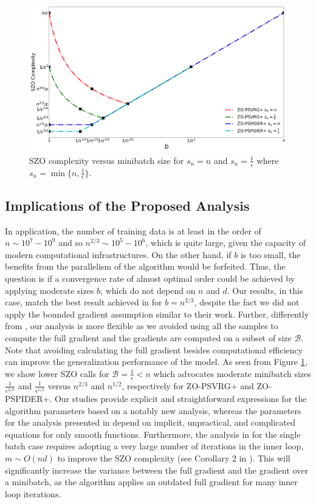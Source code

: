 \documentclass[iicol,sn-basic]{sn-jnl}
\theoremstyle{thmstyleone}%
\theoremstyle{thmstyletwo}%
\theoremstyle{thmstylethree}%
\begin{document}
\begin{figure}[hbt!]
\centering
\includegraphics[width=1.0\columnwidth]{SZO_Complexity.png}%
\caption{SZO complexity versus minibatch size for $s_n = n$ and $s_n = \frac{1}{\epsilon}$ where $s_n = \min\{n, \frac{1}{\epsilon}\}$.}
\label{order_conv_analysis-fig}
\end{figure}

\subsection{Implications of the Proposed Analysis}
In application, the number of training data is at least in the order of $n \sim 10^7-10^9$ and so $n^{2/3}\sim 10^5-10^6$, which is quite large, given the capacity of modern computational infrastructures. On the other hand, if $b$ is too small, the benefits from the parallelism of the algorithm would be forfeited. Thus, the question is if a convergence rate of almost optimal order could be achieved by applying moderate sizes $b$, which do not depend on $n$ and $d$. Our results, in this case, match the best result achieved in \cite{huang2019faster} for $b = n^{2/3}$, despite the fact we did not apply the bounded gradient assumption similar to their work. Further, differently from \cite{huang2019faster}, our analysis is more flexible as we avoided using all the samples to compute the full gradient and the gradients are computed on a subset of size $\mathcal{B}$. Note that avoiding calculating the full gradient besides computational efficiency can improve the generalization performance of the model.  As seen from Figure \ref{order_conv_analysis-fig}, we show lower SZO calls for $\mathcal{B} = \frac{1}{\epsilon} < n$ which advocates moderate minibatch sizes $\frac{1}{\epsilon^{2/3}}$ and $\frac{1}{\epsilon^{1/2}}$ versus ${n^{2/3}}$ and ${n^{1/2}}$, respectively for ZO-PSVRG+ and ZO-PSPIDER+. Our studies provide explicit and straightforward expressions for the algorithm parameters based on a notably new analysis, whereas the parameters for the analysis presented in \cite{ji2019improved} depend on implicit, unpractical, and complicated equations for only smooth functions. Furthermore, the analysis in \cite{ji2019improved} for the single batch case requires adopting a very large number of iterations in the inner loop, $m \sim O(n d)$ to improve the SZO complexity (see Corollary 2 in \cite{ji2019improved}). This will significantly increase the variance between the full gradient and the gradient over a minibatch, as the algorithm applies an outdated full gradient for many inner loop iterations.
\end{document}
